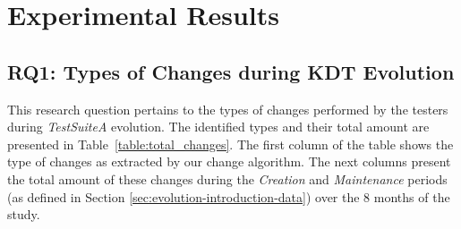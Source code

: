 \section{Experimental Results}
\label{sec:evolution-results}

\subsection{RQ1: Types of Changes during KDT Evolution}
\label{sec:evolution-results-rq1}

This research question pertains to the types of changes performed by the testers during \emph{TestSuiteA} evolution. The identified types and their total amount are presented in Table~\ref{table:total_changes}. The first column of the table shows the type of changes as extracted by our change algorithm. The next columns present the total amount of these changes during the \emph{Creation} and \emph{Maintenance} periods (as defined in Section \ref{sec:evolution-introduction-data}) over the 8 months of the study.

